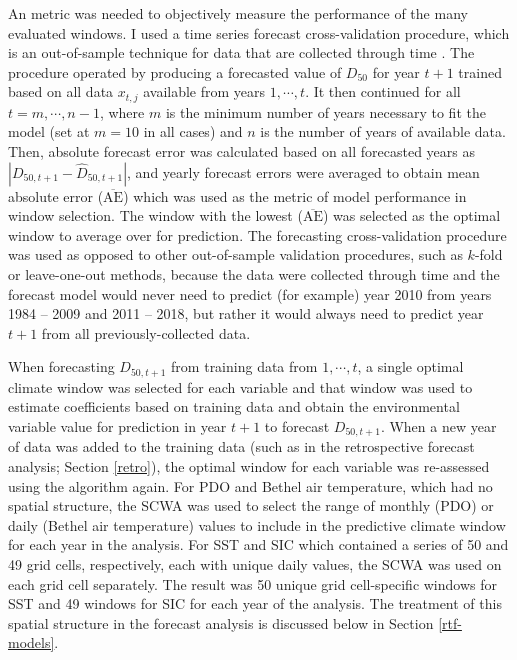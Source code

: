 \documentclass[12pt,]{book}
\theoremstyle{definition}
\theoremstyle{definition}
\theoremstyle{definition}
\theoremstyle{remark}
\begin{document}
\noindent
An metric was needed to objectively measure the performance of the many
evaluated windows. I used a time series forecast cross-validation
procedure, which is an out-of-sample technique for data that are
collected through time \citep{arlot-celisse-2010}. The procedure
operated by producing a forecasted value of \(D_{50}\) for year \(t+1\)
trained based on all data \(x_{t,j}\) available from years
\(1, \cdots, t\). It then continued for all \(t = m, \cdots, n-1\),
where \(m\) is the minimum number of years necessary to fit the model
(set at \(m = 10\) in all cases) and \(n\) is the number of years of
available data. Then, absolute forecast error was calculated based on
all forecasted years as \(|D_{50,t+1} - \hat{D}_{50,t+1}|\), and yearly
forecast errors were averaged to obtain mean absolute error
(\(\overline{\text{AE}}\)) which was used as the metric of model
performance in window selection. The window with the lowest
(\(\overline{\text{AE}}\)) was selected as the optimal window to average
over for prediction. The forecasting cross-validation procedure was used
as opposed to other out-of-sample validation procedures, such as
\(k\)-fold or leave-one-out methods, because the data were collected
through time and the forecast model would never need to predict (for
example) year 2010 from years 1984 -- 2009 and 2011 -- 2018, but rather
it would always need to predict year \(t+1\) from all
previously-collected data.

When forecasting \(D_{50,t+1}\) from training data from \(1, \cdots,t\),
a single optimal climate window was selected for each variable and that
window was used to estimate coefficients based on training data and
obtain the environmental variable value for prediction in year \(t+1\)
to forecast \(D_{50,t+1}\). When a new year of data was added to the
training data (such as in the retrospective forecast analysis; Section
\ref{retro}), the optimal window for each variable was re-assessed using
the algorithm again. For PDO and Bethel air temperature, which had no
spatial structure, the SCWA was used to select the range of monthly
(PDO) or daily (Bethel air temperature) values to include in the
predictive climate window for each year in the analysis. For SST and SIC
which contained a series of 50 and 49 grid cells, respectively, each
with unique daily values, the SCWA was used on each grid cell
separately. The result was 50 unique grid cell-specific windows for SST
and 49 windows for SIC for each year of the analysis. The treatment of
this spatial structure in the forecast analysis is discussed below in
Section \ref{rtf-models}.
\end{document}
